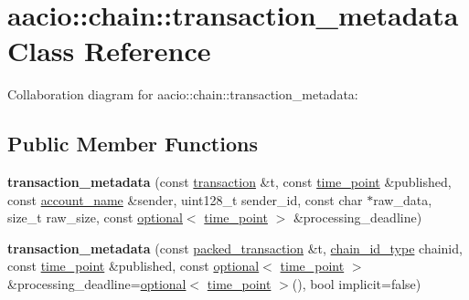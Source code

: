 \hypertarget{classaacio_1_1chain_1_1transaction__metadata}{}\section{aacio\+:\+:chain\+:\+:transaction\+\_\+metadata Class Reference}
\label{classaacio_1_1chain_1_1transaction__metadata}


Collaboration diagram for aacio\+:\+:chain\+:\+:transaction\+\_\+metadata\+:
\subsection*{Public Member Functions}
\begin{DoxyCompactItemize}
\item 
\mbox{\label{classaacio_1_1chain_1_1transaction__metadata_a0fc173ba718bc6195e2ecc8894f46cfe}} 
{\bfseries transaction\+\_\+metadata} (const \mbox{\hyperlink{structaacio_1_1chain_1_1transaction}{transaction}} \&t, const \mbox{\hyperlink{classfc_1_1time__point}{time\+\_\+point}} \&published, const \mbox{\hyperlink{structaacio_1_1chain_1_1name}{account\+\_\+name}} \&sender, uint128\+\_\+t sender\+\_\+id, const char $\ast$raw\+\_\+data, size\+\_\+t raw\+\_\+size, const \mbox{\hyperlink{classfc_1_1optional}{optional}}$<$ \mbox{\hyperlink{classfc_1_1time__point}{time\+\_\+point}} $>$ \&processing\+\_\+deadline)
\item 
\mbox{\label{classaacio_1_1chain_1_1transaction__metadata_ad381f455d6f59a160445cfab1255dfdc}} 
{\bfseries transaction\+\_\+metadata} (const \mbox{\hyperlink{structaacio_1_1chain_1_1packed__transaction}{packed\+\_\+transaction}} \&t, \mbox{\hyperlink{classfc_1_1sha256}{chain\+\_\+id\+\_\+type}} chainid, const \mbox{\hyperlink{classfc_1_1time__point}{time\+\_\+point}} \&published, const \mbox{\hyperlink{classfc_1_1optional}{optional}}$<$ \mbox{\hyperlink{classfc_1_1time__point}{time\+\_\+point}} $>$ \&processing\+\_\+deadline=\mbox{\hyperlink{classfc_1_1optional}{optional}}$<$ \mbox{\hyperlink{classfc_1_1time__point}{time\+\_\+point}} $>$(), bool implicit=false)
\item 
\mbox{\label{classaacio_1_1chain_1_1transaction__metadata_a8c73b0372954614962107eaa88024ff4}} 

\end{DoxyCompactItemize}
